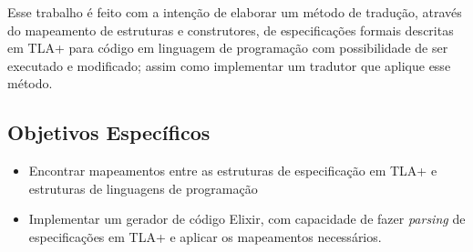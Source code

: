 Esse trabalho é feito com a intenção de elaborar um método de tradução, através do mapeamento de estruturas e construtores, de especificações formais descritas em TLA+ para código em linguagem de programação com possibilidade de ser executado e modificado; assim como implementar um tradutor que aplique esse método.

\subsection{Objetivos Específicos}
\begin{itemize}
  \item Encontrar mapeamentos entre as estruturas de especificação em TLA+ e estruturas de linguagens de programação
  \item Implementar um gerador de código Elixir, com capacidade de fazer \textit{parsing} de especificações em TLA+ e aplicar os mapeamentos necessários.
\end{itemize}
